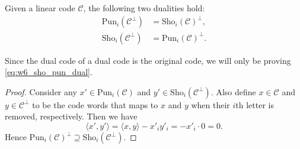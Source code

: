 \begin{theorem}
    Given a linear code $\mathcal{C}$, the following two dualities hold:
    \begin{align}
        \mathrm{Pun}_i(\mathcal{C}^\perp) &= \mathrm{Sho}_i(\mathcal{C})^\perp, \\
        \mathrm{Sho}_i(\mathcal{C}^\perp) &= \mathrm{Pun}_i(\mathcal{C})^\perp. \label{eq:w6_sho_pun_dual}
    \end{align}
\end{theorem}
Since the dual code of a dual code is the original code, we will only be proving \autoref{eq:w6_sho_pun_dual}.
\begin{proof}
    Consider any $x'\in\mathrm{Pun}_i(\mathcal{C})$ and $y'\in\mathrm{Sho}_i(\mathcal{C}^\perp)$. Also define $x\in\mathcal{C}$ and $y\in\mathcal{C}^\perp$ to be the code words that maps to $x$ and $y$ when their $i$th letter is removed, respectively. Then we have
    \begin{equation*}
        \langle x',y'\rangle = \langle x,y\rangle - x'_iy'_i = -x'_i\cdot 0 = 0.
    \end{equation*}
    Hence $\mathrm{Pun}_i(\mathcal{C})^\perp \supseteq \mathrm{Sho}_i(\mathcal{C}^\perp)$.


\end{proof}
